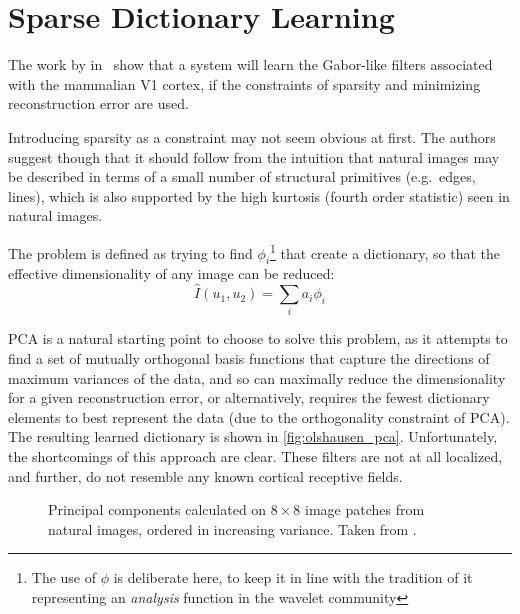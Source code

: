 \section{Sparse Dictionary Learning}
  The work by \citeauthor{olshausen_emergence_1996}
  in~\citep{olshausen_emergence_1996, olshausen_sparse_1997} show that a system
  will learn the Gabor-like filters associated with the mammalian V1 cortex, if
  the constraints of sparsity and minimizing reconstruction error are used.

  Introducing sparsity as a constraint may not seem obvious at first. The
  authors suggest though that it should follow from the intuition that natural
  images may be described in terms of a small number of structural primitives
  (e.g.\ edges, lines)\cite{field_what_1994}, which is also supported by the
  high kurtosis (fourth order statistic) seen in natural
  images\citep{field_scale-invariance_1993}.

  The problem is defined as trying to find $\phi_{i}$\footnote{The use of
  $\phi$ is deliberate here, to keep it in line with the tradition of it
  representing an \emph{analysis} function in the wavelet community} that
  create a dictionary, so that the effective dimensionality of any image can be
  reduced:
  $$\hat{I}(u_1, u_2) = \sum_{i} a_{i} \phi_{i} $$

  PCA is a natural starting point to choose to solve this problem, as it
  attempts to find a set of mutually orthogonal basis functions that capture the
  directions of maximum variances of the data, and so can maximally reduce the
  dimensionality for a given reconstruction error, or alternatively, requires
  the fewest dictionary elements to best represent the data (due to the
  orthogonality constraint of PCA). The resulting learned dictionary is shown
  in \autoref{fig:olshausen_pca}. Unfortunately, the shortcomings of this
  approach are clear. These filters are not at all localized, and further, do
  not resemble any known cortical receptive fields.

  \begin{figure}
    \begin{center}
      \caption[Principal components learned on natural images]
              {Principal components calculated on $8\times 8$ image patches from
               natural images, ordered in increasing variance. Taken from
               \citep{olshausen_emergence_1996}.}
       \label{fig:olshausen_pca}
    \end{center}
  \end{figure}

